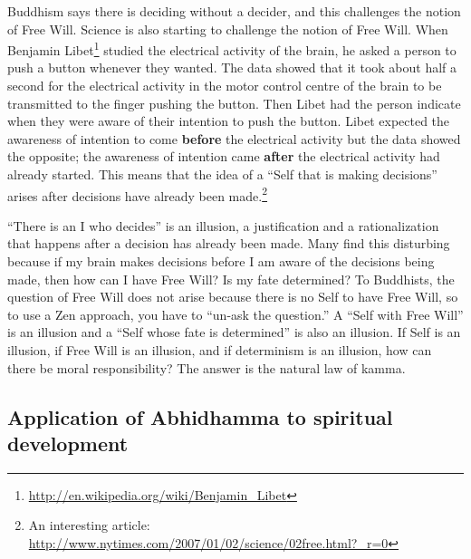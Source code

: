 Buddhism says there is deciding without a decider, and this challenges the notion of Free Will. Science is also starting to challenge the notion of Free Will. When Benjamin Libet\footnote{\url{http://en.wikipedia.org/wiki/Benjamin_Libet}} studied the electrical activity of the brain, he asked a person to push a button whenever they wanted. The data showed that it took about half a second for the electrical activity in the motor control centre of the brain to be transmitted to the finger pushing the button. Then Libet had the person indicate when they were aware of their intention to push the button. Libet expected the awareness of intention to come \textbf{before} the electrical activity but the data showed the opposite; the awareness of intention came \textbf{after} the electrical activity had already started. This means that the idea of a “Self that is making decisions” arises after decisions have already been made.\footnote{An interesting article: \url{http://www.nytimes.com/2007/01/02/science/02free.html?_r=0}}

“There is an I who decides” is an illusion, a justification and a rationalization that happens after a decision has already been made. Many find this disturbing because if my brain makes decisions before I am aware of the decisions being made, then how can I have Free Will? Is my fate determined? To Buddhists, the question of Free Will does not arise because there is no Self to have Free Will, so to use a Zen approach, you have to “un-ask the question.” A “Self with Free Will” is an illusion and a “Self whose fate is determined” is also an illusion. If Self is an illusion, if Free Will is an illusion, and if determinism is an illusion, how can there be moral responsibility? The answer is the natural law of kamma.

\subsection*{Application of Abhidhamma to spiritual development}

